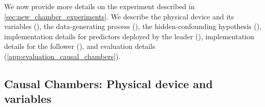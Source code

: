 We now provide more details on the experiment described in \cref{sec:new_chamber_experiments}.
We describe the physical device 
and its variables (), the data-generating process (), the hidden-confounding hypothesis (), implementation details for predictors deployed by the leader (), implementation details for the follower (), and evaluation details (\cref{app:evaluation_causal_chambers}).


\subsection{Causal Chambers: Physical device and variables} \label{app:causal_chambers_device}



